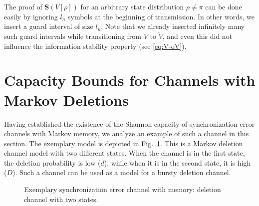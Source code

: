\documentclass[journal, twocol]{IEEEtran}
\newcommand{\bfS}{{\mathbf{S}}}
\newcommand{\tV}{{\widetilde{V}}}
\begin{document}
The proof of $\bfS(V[\rho])$ for an arbitrary state distribution $\rho\neq \pi$ can be done easily by ignoring $l_n$ symbols at the beginning of transmission.
In other words, we insert a guard interval of size $l_n$.
Note that we already inserted infinitely many such guard intervals while transitioning from $V$ to $\tV$, and even this did not influence the information stability property (see \eqref{eq:V-oV}).

\section{Capacity Bounds for Channels with Markov Deletions}
\label{s:capa}

Having established the existence of the Shannon capacity of synchronization error channels with Markov memory, we analyze an example of such a channel in this section. The exemplary model is depicted in Fig.~\ref{fig:markovmodel}.
This is a Markov deletion channel model with two different states.
When the channel is in the first state, the deletion probability is low ($d$), while when it is in the second state, it is high ($D$).
Such a channel can be used as a model for a bursty deletion channel.

\begin{figure}
\centering
{}
\caption{Exemplary synchronization error channel with memory: deletion channel with two states.}
\label{fig:markovmodel}
\end{figure}
\end{document}

